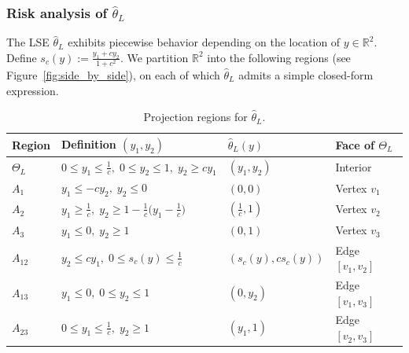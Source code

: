 \documentclass[11pt]{article}
\theoremstyle{plain}
\theoremstyle{definition}
\providecommand{\mathbbm}{\mathbb} %
\newcommand{\R}{\mathbbm{R}}
\newcommand{\hattheta}{\hat{\theta}}
\begin{document}
\subsubsection{Risk analysis of \texorpdfstring{$\hattheta_L$}{theta-hat L}}
The LSE $\hattheta_L$ exhibits piecewise behavior depending on the location of $y \in \R^2$.
Define $s_c(y) := \frac{y_1 + c y_2}{1+c^2}$. We partition $\R^2$ into the following regions (see Figure~\ref{fig:side_by_side}), on each of which $\hattheta_L$ admits a simple closed-form expression.
\begin{table}[htbp]
\centering
\caption{Projection regions for  $\hattheta_L$.}
\label{tab:regions}

\begingroup
\renewcommand{\arraystretch}{1.35}
\setlength{\tabcolsep}{6pt}

\begin{tabular}{l|p{5.6cm}|l|l}
\hline
Region 
& Definition $(y_1,y_2)$ 
& $\hat\theta_L(y)$ 
& Face of $\Theta_L$ \\
\hline\hline

$\Theta_L$
& $0 \le y_1 \le \frac{1}{c},\; 0 \le y_2 \le 1,\; y_2 \ge c y_1$
& $(y_1,y_2)$
& Interior \\
\hline

$A_1$
& $y_1 \le -c y_2,\; y_2 \le 0$
& $(0,0)$
& Vertex $v_1$ \\
\hline

$A_2$
& $y_1 \ge \frac{1}{c},\; y_2 \ge 1 - \frac{1}{c}\bigl(y_1 - \frac{1}{c}\bigr)$
& $(\frac{1}{c},1)$
& Vertex $v_2$ \\
\hline

$A_3$
& $y_1 \le 0,\; y_2 \ge 1$
& $(0,1)$
& Vertex $v_3$ \\
\hline

$A_{12}$
& $y_2 \le c y_1,\; 0 \le s_c(y) \le \frac{1}{c}$
& $(s_c(y), c s_c(y))$
& Edge $[v_1,v_2]$ \\
\hline

$A_{13}$
& $y_1 \le 0,\; 0 \le y_2 \le 1$
& $(0,y_2)$
& Edge $[v_1,v_3]$ \\
\hline

$A_{23}$
& $0 \le y_1 \le \frac{1}{c},\; y_2 \ge 1$
& $(y_1,1)$
& Edge $[v_2,v_3]$ \\
\hline
\end{tabular}

\endgroup
\end{table}
\end{document}

